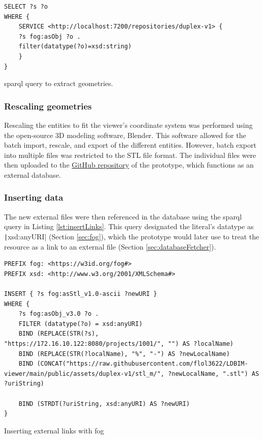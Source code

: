 \begin{listing}[H]
    \begin{verbatim}
SELECT ?s ?o
WHERE {
    SERVICE <http://localhost:7200/repositories/duplex-v1> {
    ?s fog:asObj ?o .
    filter(datatype(?o)=xsd:string)
    }
}
    \end{verbatim}
    \caption{\acs{sparql} query to extract geometries.}
    \label{lst:extractGeometries}
\end{listing}


\subsubsection{Rescaling geometries}
Rescaling the entities to fit the viewer's coordinate system was performed using the open-source 3D modeling software, Blender. This software allowed for the batch import, rescale, and export of the different entities. However, batch export into multiple files was restricted to the STL file format. The individual files were then uploaded to the \href{https://github.com/flol3622/LDBIM-viewer}{GitHub repository} of the prototype, which functions as an external database.

\subsubsection{Inserting data}

The new external files were then referenced in the database using the \ac{sparql} query in Listing \ref{lst:insertLinks}. This query designated the literal's datatype as \texttt|xsd:anyURI| (Section \ref{sec:fog}), which the prototype would later use to treat the resource as a link to an external file (Section \ref{sec:databaseFetcher}).

\begin{listing}[H]
    \begin{verbatim}
PREFIX fog: <https://w3id.org/fog#>
PREFIX xsd: <http://www.w3.org/2001/XMLSchema#>

INSERT { ?s fog:asStl_v1.0-ascii ?newURI }
WHERE { 
    ?s fog:asObj_v3.0 ?o .
    FILTER (datatype(?o) = xsd:anyURI)
    BIND (REPLACE(STR(?s), "https://172.16.10.122:8080/projects/1001/", "") AS ?localName)
    BIND (REPLACE(STR(?localName), "%", "-") AS ?newLocalName)
    BIND (CONCAT("https://raw.githubusercontent.com/flol3622/LDBIM-viewer/main/public/assets/duplex-v1/stl_m/", ?newLocalName, ".stl") AS ?uriString)
    
    BIND (STRDT(?uriString, xsd:anyURI) AS ?newURI)
}
    \end{verbatim}
    \caption{Inserting external links with \acs{fog}}
    \label{lst:insertLinks}
\end{listing}

